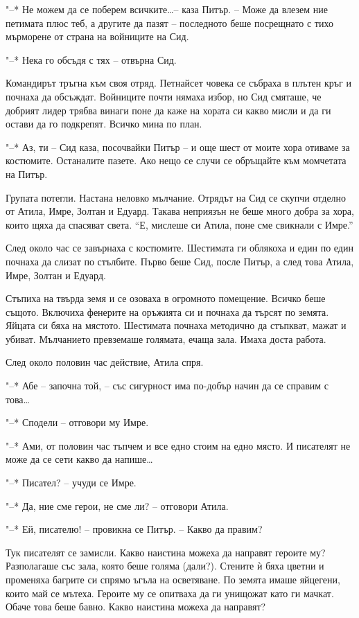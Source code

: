 \documentclass[ebook,openany,12pt]{memoir}
\begin{document}
"--* Не можем да се поберем всичките\ldots -- каза Питър. – Може да влезем ние петимата плюс теб, а другите да пазят – последното беше посрещнато с тихо мърморене от страна на войниците на Сид.

"--* Нека го обсъдя с тях – отвърна Сид.

Командирът тръгна към своя отряд. Петнайсет човека се събраха в плътен кръг и почнаха да обсъждат. Войниците почти нямаха избор, но Сид смяташе, че добрият лидер трябва винаги поне да каже на хората си какво мисли и да ги остави да го подкрепят. Всичко мина по план.

"--* Аз, ти – Сид каза, посочвайки Питър – и още шест от моите хора отиваме за костюмите. Останалите пазете. Ако нещо се случи се обръщайте към момчетата на Питър.

Групата потегли. Настана неловко мълчание. Отрядът на Сид се скупчи отделно от Атила, Имре, Золтан и Едуард. Такава неприязън не беше много добра за хора, които щяха да спасяват света. ``Е, мислеше си Атила, поне сме свикнали с Имре.''

След около час се завърнаха с костюмите. Шестимата ги облякоха и един по един почнаха да слизат по стълбите. Първо беше Сид, после Питър, а след това Атила, Имре, Золтан и Едуард.

Стъпиха на твърда земя и се озоваха в огромното помещение. Всичко беше същото. Включиха фенерите на оръжията си и почнаха да търсят по земята. Яйцата си бяха на мястото. Шестимата почнаха методично да стъпкват, мажат и убиват. Мълчанието превземаше голямата, ечаща зала. Имаха доста работа.

След около половин час действие, Атила спря.

"--* Абе -- започна той, – със сигурност има по-добър начин да се справим с това\ldots

"--* Сподели – отговори му Имре.

"--* Ами, от половин час тъпчем и все едно стоим на едно място. И писателят не може да се сети какво да напише\ldots

"--* Писател? – учуди се Имре.

"--* Да, ние сме герои, не сме ли? – отговори Атила.

"--* Ей, писателю! – провикна се Питър. – Какво да правим?

Тук писателят се замисли. Какво наистина можеха да направят героите му? Разполагаше със зала, която беше голяма (дали?). Стените ѝ бяха цветни и променяха багрите си спрямо ъгъла на осветяване. По земята имаше яйцегени, които май се мътеха. Героите му се опитваха да ги унищожат като ги мачкат. Обаче това беше бавно. Какво наистина можеха да направят?
\end{document}
